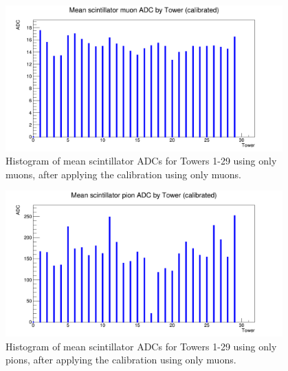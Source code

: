 \begin{figure}[h]
	\centering
	\includegraphics[width=0.95\textwidth]{../Pictures/IDEA/Calibration/towerplot-scintillator-mean-muoncalibrated-muons.png}
	\caption{Histogram of mean scintillator \acrshort{ADC}s for Towers 1-29 using only muons, after applying the calibration using only muons.}
	\label{figure:testbeam/results/towerplot-mean-muoncalibrated-muons}
\end{figure}

\begin{figure}[h]
	\centering
	\includegraphics[width=0.95\textwidth]{../Pictures/IDEA/Calibration/towerplot-scintillator-mean-muoncalibrated-pions.png}
	\caption{Histogram of mean scintillator \acrshort{ADC}s for Towers 1-29 using only pions, after applying the calibration using only muons.}
	\label{figure:testbeam/results/towerplot-mean-muoncalibrated-pions}
\end{figure}

